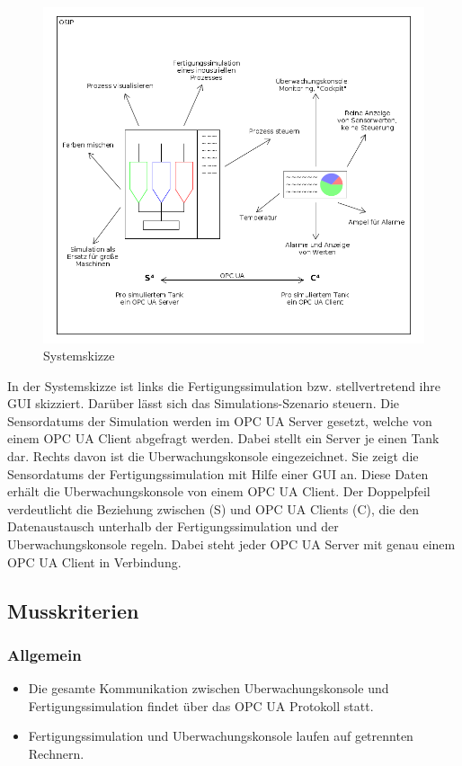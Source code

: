 \documentclass[parskip=full]{scrartcl}
\begin{document}
\begin{figure}[h]
  \centering
  \includegraphics[scale=0.5]{../system-sketch.png}
  \caption{Systemskizze}
\end{figure}

In der Systemskizze ist links die \gls{Fertigungssimulation} bzw. stellvertretend ihre \gls{GUI} skizziert.
Darüber lässt sich das \gls{Simulations-Szenario} steuern. Die \glspl{Sensordatum} der Simulation werden 
im \gls{OPC UA Server} gesetzt, welche von einem \gls{OPC UA Client} abgefragt werden. 
Dabei stellt ein Server je einen Tank dar. Rechts davon ist die \gls{Uberwachungskonsole} eingezeichnet.
Sie zeigt die \glspl{Sensordatum} der \gls{Fertigungssimulation} mit Hilfe einer \gls{GUI} an. 
Diese Daten erhält die \gls{Uberwachungskonsole} von einem \gls{OPC UA Client}. 
Der Doppelpfeil verdeutlicht die Beziehung zwischen  (S) und
\glspl{OPC UA Client} (C), die den Datenaustausch unterhalb der \gls{Fertigungssimulation} und
der \gls{Uberwachungskonsole} regeln.
Dabei steht jeder \gls{OPC UA Server} mit genau einem {OPC UA Client} in Verbindung.

\subsection{Musskriterien}
\subsubsection{Allgemein}
\begin{itemize}
  \item Die gesamte Kommunikation zwischen \gls{Uberwachungskonsole} und \gls{Fertigungssimulation} findet \"uber das \gls{OPC UA} Protokoll statt.
  \item \gls{Fertigungssimulation} und \gls{Uberwachungskonsole} laufen auf getrennten Rechnern.
\end{itemize}
\end{document}
